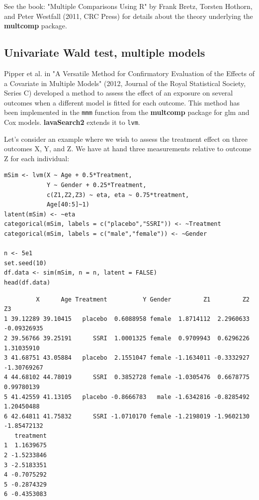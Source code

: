 \documentclass[12pt]{article}
\begin{document}
See the book: "Multiple Comparisons Using R" by Frank Bretz, Torsten
Hothorn, and Peter Westfall (2011, CRC Press) for details about the
theory underlying the \textbf{multcomp} package.

\subsection{Univariate Wald test, multiple models}
\label{sec:org11c88f0}

Pipper et al. in "A Versatile Method for Confirmatory Evaluation of
the Effects of a Covariate in Multiple Models" (2012, Journal of the
Royal Statistical Society, Series C) developed a method to assess the
effect of an exposure on several outcomes when a different model is
fitted for each outcome. This method has been implemented in the \texttt{mmm}
function from the \textbf{multcomp} package for glm and Cox
models. \textbf{lavaSearch2} extends it to \texttt{lvm}. 

Let's consider an example where we wish to assess the treatment effect
on three outcomes X, Y, and Z. We have at hand three measurements
relative to outcome Z for each individual:
\lstset{language=r,label= ,caption= ,captionpos=b,numbers=none}
\begin{lstlisting}
mSim <- lvm(X ~ Age + 0.5*Treatment,
            Y ~ Gender + 0.25*Treatment,
            c(Z1,Z2,Z3) ~ eta, eta ~ 0.75*treatment,
            Age[40:5]~1)
latent(mSim) <- ~eta
categorical(mSim, labels = c("placebo","SSRI")) <- ~Treatment
categorical(mSim, labels = c("male","female")) <- ~Gender

n <- 5e1
set.seed(10)
df.data <- sim(mSim, n = n, latent = FALSE)
head(df.data)
\end{lstlisting}

\begin{verbatim}
         X      Age Treatment          Y Gender         Z1         Z2          Z3
1 39.12289 39.10415   placebo  0.6088958 female  1.8714112  2.2960633 -0.09326935
2 39.56766 39.25191      SSRI  1.0001325 female  0.9709943  0.6296226  1.31035910
3 41.68751 43.05884   placebo  2.1551047 female -1.1634011 -0.3332927 -1.30769267
4 44.68102 44.78019      SSRI  0.3852728 female -1.0305476  0.6678775  0.99780139
5 41.42559 41.13105   placebo -0.8666783   male -1.6342816 -0.8285492  1.20450488
6 42.64811 41.75832      SSRI -1.0710170 female -1.2198019 -1.9602130 -1.85472132
   treatment
1  1.1639675
2 -1.5233846
3 -2.5183351
4 -0.7075292
5 -0.2874329
6 -0.4353083
\end{verbatim}
\end{document}

